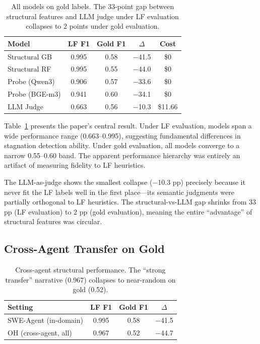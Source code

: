 \documentclass[11pt]{article}
\begin{document}
\begin{table}[t]
\centering
\small
\begin{tabular}{lcccc}
\toprule
\textbf{Model} & \textbf{LF F1} & \textbf{Gold F1} & \textbf{$\Delta$} & \textbf{Cost} \\
\midrule
Structural GB    & 0.995 & 0.58 & $-$41.5 & \$0 \\
Structural RF    & 0.995 & 0.55 & $-$44.0 & \$0 \\
Probe (Qwen3)    & 0.906 & 0.57 & $-$33.6 & \$0 \\
Probe (BGE-m3)   & 0.941 & 0.60 & $-$34.1 & \$0 \\
LLM Judge        & 0.663 & 0.56 & $-$10.3 & \$11.66 \\
\bottomrule
\end{tabular}
\caption{All models on gold labels. The 33-point gap between structural features and LLM judge under LF evaluation collapses to 2 points under gold evaluation.}
\label{tab:convergence}
\end{table}

Table~\ref{tab:convergence} presents the paper's central result. Under LF evaluation, models span a wide performance range (0.663--0.995), suggesting fundamental differences in stagnation detection ability. Under gold evaluation, all models converge to a narrow 0.55--0.60 band. The apparent performance hierarchy was entirely an artifact of measuring fidelity to LF heuristics.

The LLM-as-judge shows the smallest collapse ($-$10.3 pp) precisely because it never fit the LF labels well in the first place---its semantic judgments were partially orthogonal to LF heuristics. The structural-vs-LLM gap shrinks from 33 pp (LF evaluation) to 2 pp (gold evaluation), meaning the entire ``advantage'' of structural features was circular.

\subsection{Cross-Agent Transfer on Gold}

\begin{table}[t]
\centering
\small
\begin{tabular}{lccc}
\toprule
\textbf{Setting} & \textbf{LF F1} & \textbf{Gold F1} & \textbf{$\Delta$} \\
\midrule
SWE-Agent (in-domain)    & 0.995 & 0.58 & $-$41.5 \\
OH (cross-agent, all)    & 0.967 & 0.52 & $-$44.7 \\
\bottomrule
\end{tabular}
\caption{Cross-agent structural performance. The ``strong transfer'' narrative (0.967) collapses to near-random on gold (0.52).}
\label{tab:cross-agent}
\end{table}
\end{document}
